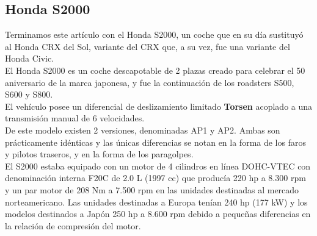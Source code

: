 \documentclass[10pt,a4paper]{report}
\begin{document}
\subsection{Honda S2000}

Terminamos este artículo con el Honda S2000, un coche que en su día sustituyó al Honda CRX del Sol, variante del CRX que, a su vez, fue una variante del Honda Civic.\\
El Honda S2000 es un coche descapotable de 2 plazas creado para celebrar el 50 aniversario de la marca japonesa, y fue la continuación de los roadsters S500, S600 y S800. \\
El vehículo posee un diferencial de deslizamiento limitado \textbf{Torsen} acoplado a una transmisión manual de 6 velocidades.
\\

De este modelo existen 2 versiones, denominadas AP1 y AP2. Ambas son prácticamente idénticas y las únicas diferencias se notan en la forma de los faros y pilotos traseros, y en la forma de los paragolpes.
\\

El S2000 estaba equipado con un motor de 4 cilindros en línea DOHC-VTEC con denominación interna F20C de 2.0 L (1997 cc) que producía 220 hp a 8.300 rpm y un par motor de 208 Nm a 7.500 rpm en las unidades destinadas al mercado norteamericano. Las unidades destinadas a Europa tenían 240 hp (177 kW) y los modelos destinados a Japón 250 hp a 8.600 rpm debido a pequeñas diferencias en la relación de compresión del motor.
\\
\end{document}
